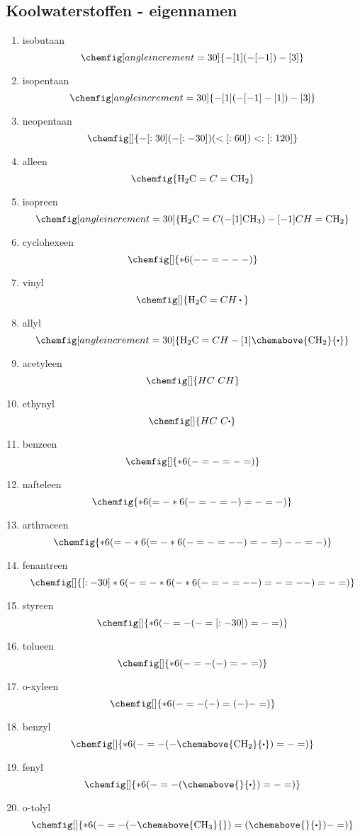 \documentclass[a4paper,12pt]{article}
\begin{document}
    \subsection*{Koolwaterstoffen - eigennamen}
    \begin{enumerate}
        \item isobutaan $$\chemfig[angle increment=30]{-[1](-[-1])-[3]}$$
        \item isopentaan $$\chemfig[angle increment=30]{-[1](-[-1]-[1])-[3]}$$
        \item neopentaan $$\chemfig[]{-[:30](-[:-30])(<[:60])<:[:120]}$$
        \item alleen $$\chemfig{\ce{H2C}=C=\ce{CH2}}$$
        \item isopreen $$\chemfig[angle increment=30]{\ce{H2C}=C(-[1]\ce{CH3})-[-1]CH=\ce{CH2}}$$
        \item cyclohexeen $$\chemfig[]{*6(--=---)}$$
        \item vinyl $$\chemfig[]{\ce{H2C}=CH\bigcdot{}}$$
        \item allyl $$\chemfig[angle increment=30]{\ce{H2C}=CH-[1]\chemabove{\ce{CH2}}{\bigcdot}}$$
        \item acetyleen $$\chemfig[]{HC~CH}$$
        \item ethynyl $$\chemfig[]{HC~C\bigcdot}$$
        \item benzeen $$\chemfig[]{*6(-=-=-=)}$$
        \item nafteleen $$\chemfig{*6(=-*6(-=-=-)=-=-)}$$
        \item arthraceen $$\chemfig{*6(=-*6(=-*6(-=-=--)=-=)--=-)}$$
        \item fenantreen $$\chemfig[]{[:-30]*6(-=-*6(-*6(-=-=--)=-=--)=-=)}$$
        \item styreen $$\chemfig[]{*6(-=-(-=[:-30])=-=)}$$
        \item tolueen $$\chemfig[]{*6(-=-(-)=-=)}$$
        \item o-xyleen $$\chemfig[]{*6(-=-(-)=(-)-=)}$$
        \item benzyl $$\chemfig[]{*6(-=-(-\chemabove{\ce{CH2}}{\bigcdot{}})=-=)}$$
        \item fenyl $$\chemfig[]{*6(-=-(\chemabove{}{\bigcdot{}})=-=)}$$
        \item o-tolyl $$\chemfig[]{*6(-=-(-\chemabove{\ce{CH3}}{})=(\chemabove{}{\bigcdot{}})-=)}$$
    \end{enumerate}
\end{document}
